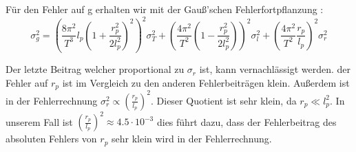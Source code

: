 \documentclass[twoside]{protokoll}
\begin{document}
Für den Fehler auf g erhalten wir mit der Gauß'schen Fehlerfortpflanzung :
\begin{equation}
\sigma_g^2 = \left(\frac{8\pi^2}{T^3}l_p\left(1+\frac{r_p^2}{2l_p^2}\right)^2\right)^2 \sigma_T^2 + \left(\frac{4\pi^2}{T^2}\left(1-\frac{r_p^2}{2l_p^2}\right)\right)^2\sigma_l^2 + \left(\frac{4\pi^2}{T^2}\frac{r_p}{l_p}\right)^2\sigma_r^2 
\end{equation}

Der letzte Beitrag welcher proportional zu $\sigma_r$ ist, kann vernachlässigt werden. 
der Fehler auf $r_p$ ist im Vergleich zu den anderen Fehlerbeiträgen klein. 
Außerdem ist in der Fehlerrechnung $\sigma_r^2 \propto \left(\frac{r_p}{l_p}\right)^2$.
Dieser Quotient ist sehr klein, da $ r_p \ll l_p^2 $. 
In unserem Fall ist $\left(\frac{r_p}{l_p}\right)^2 \approx 4.5\cdot10^{-3} $
dies führt dazu, dass der Fehlerbeitrag des absoluten Fehlers von $r_p$ sehr klein wird in der Fehlerrechnung.
\end{document}
